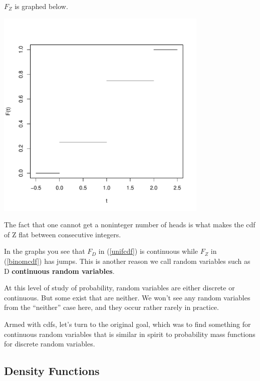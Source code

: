 $F_Z$ is graphed below.  

\includegraphics[width=4in]{FZ.pdf}

The fact that one cannot get a noninteger number of heads is what makes
the cdf of Z flat between consecutive integers.          

In the graphs you see that $F_D$ in (\ref{unifcdf}) is continuous while
$F_Z$ in (\ref{binomcdf}) has jumps.  This is another reason we call
random variables such as D {\bf continuous random variables}. 


At this level of study of probability, random variables are either
discrete or continuous.  But some exist that are neither.  We won't see
any random variables from the ``neither'' case here, and they occur
rather rarely in practice.

Armed with cdfs, let's turn to the original goal, which was to find
something for continuous random variables that is similar in spirit to
probability mass functions for discrete random variables.

\subsection{Density Functions}
\label{densitymotivation}

